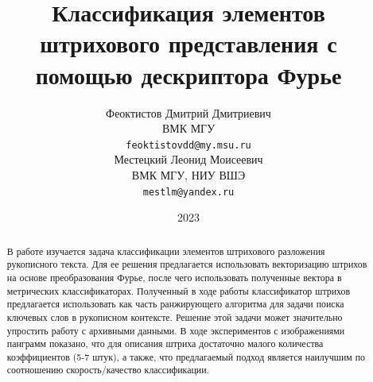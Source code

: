 \documentclass{article}
\title{Классификация элементов штрихового представления с помощью дескриптора Фурье}
\author{ Феоктистов Дмитрий Дмитриевич \\
	ВМК МГУ\\
	\texttt{feoktistovdd@my.msu.ru} \\
	\And
	Местецкий Леонид Моисеевич \\
	ВМК МГУ, НИУ ВШЭ\\
	\texttt{mestlm@yandex.ru} \\
}
\date{2023}
\begin{document}
\maketitle
\begin{abstract}
В работе изучается задача классификации элементов штрихового разложения рукописного текста. Для ее решения предлагается использовать векторизацию штрихов на основе преобразования Фурье, после чего использовать полученные вектора в метрических классификаторах. Полученный в ходе работы классификатор штрихов предлагается использовать как часть ранжирующего алгоритма для задачи поиска ключевых слов в рукописном контексте. Решение этой задачи может значительно упростить работу с архивными данными. В ходе экспериментов с изображениями панграмм показано, что для описания штриха достаточно малого количества коэффициентов (5-7 штук), а также, что предлагаемый подход является наилучшим по соотношению скорость/качество классификации. 
\end{abstract}


\end{document}
